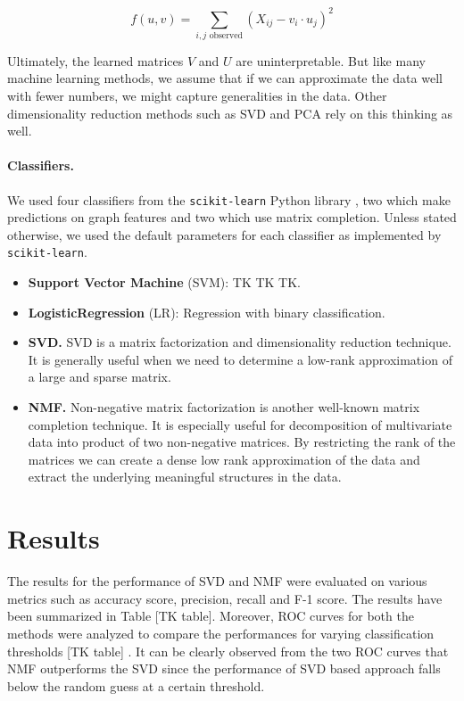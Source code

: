 \documentclass{article} %
\begin{document}
$$
f(u, v) = \sum_{i,j \text{ observed}} (X_{ij} - v_i \cdot u_j)^2
$$

Ultimately, the learned matrices $V$ and $U$ are uninterpretable. But like many machine learning methods, we assume that if we can approximate the data well with fewer numbers, we might capture generalities in the data. Other dimensionality reduction methods such as SVD and PCA rely on this thinking as well.

\paragraph{Classifiers.} We used four classifiers from the \texttt{scikit-learn} Python library \cite{scikit-learn}, two which make predictions on graph features and two which use matrix completion. Unless stated otherwise, we used the default parameters for each classifier as implemented by \texttt{scikit-learn}.

\begin{itemize}

\item \textbf{Support Vector Machine} (SVM): TK TK TK.

\item \textbf{LogisticRegression} (LR): Regression with binary classification.

\item \textbf{SVD.} SVD is a matrix factorization and dimensionality reduction technique. It is generally useful when we need to determine a low-rank approximation of a large and sparse matrix.     

\item \textbf{NMF.} Non-negative matrix factorization is another well-known matrix completion technique. It is especially useful for decomposition of multivariate data into product of two non-negative matrices. By restricting the rank of the matrices we can create a dense low rank approximation of the data and extract the underlying meaningful structures in the data.

\end{itemize}

\section{Results}

The results for the performance of SVD and NMF were evaluated on various metrics such as accuracy score, precision, recall and F-1 score. The results have been summarized in Table [TK table]. Moreover, ROC curves for both the methods were analyzed to compare the performances for varying classification thresholds [TK table] . It can be clearly observed from the two ROC curves that NMF outperforms the SVD since the performance of SVD based approach falls below the random guess at a certain threshold.
\end{document}
